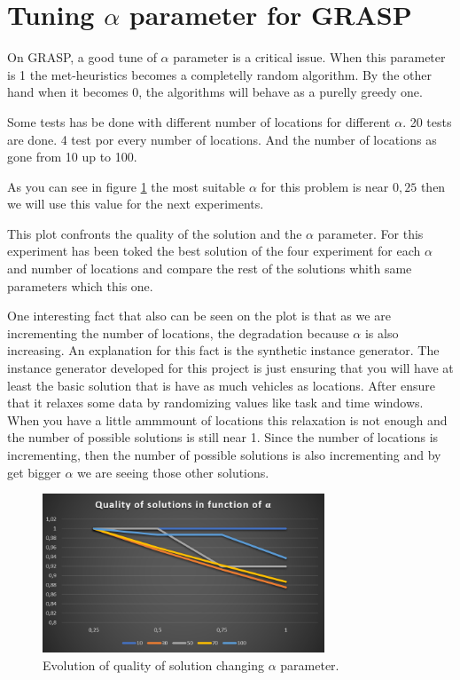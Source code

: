 \documentclass[]{report}
\begin{document}
\section{Tuning $\alpha$ parameter for GRASP}\label{s:tuning_alpha}

On GRASP, a good tune of $\alpha$ parameter is a critical issue. When this parameter is 1 the met-heuristics becomes a completelly random algorithm. By the other hand when it becomes 0, the algorithms will behave as a purelly greedy one.

Some tests has be done with different number of locations for different $\alpha$. 20 tests are done. 4 test por every number of locations. And the number of locations as gone from 10 up to 100.

As you can see in figure \ref{img:grasp_alfa} the most suitable $\alpha$ for this problem is near $0,25$ then we will use this value for the next experiments.

This plot confronts the quality of the solution and the $\alpha$ parameter. For this experiment has been toked the best solution of the four experiment for each $\alpha$ and number of locations and compare the rest of the solutions whith same parameters which this one.

One interesting fact that also can be seen on the plot is that as we are incrementing the number of locations, the degradation because $\alpha$ is also increasing. An explanation for this fact is the synthetic instance generator. The instance generator developed for this project is just ensuring that you will have at least the basic solution that is have as much vehicles as locations. After ensure that it relaxes some data by randomizing values like task and time windows. When you have a little ammmount of locations this relaxation is not enough and the number of possible solutions is still near 1. Since the number of locations is incrementing, then the number of possible solutions is also incrementing and by get bigger $\alpha$ we are seeing those other solutions.


\begin{figure}
	\caption{Evolution of quality of solution changing $\alpha$ parameter.}
	\label{img:grasp_alfa}
	\centering
	\includegraphics[width=0.75\textwidth]{./imgs/grasp_alfa_comparissons}
\end{figure}
\end{document}
